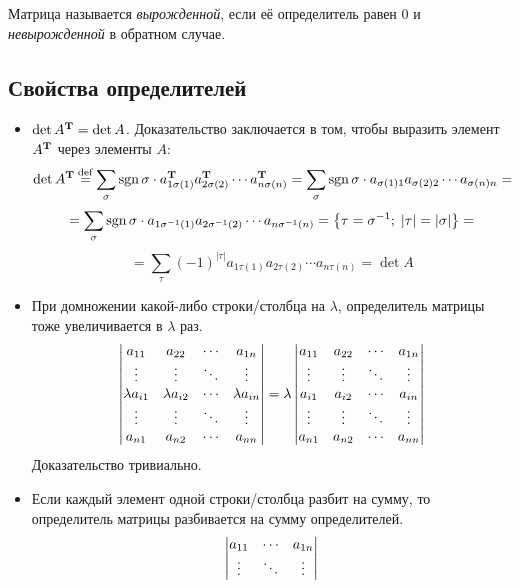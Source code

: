 \begin{df}
  Матрица называется \emph{вырожденной}, если её определитель равен 0 и \emph{невырожденной} в обратном случае.
\end{df}

\subsection{Свойства определителей}

\label{matrixdet:props}

\begin{itemize}
	\item $\det A^{\mathbf{T}}=\det A$. Доказательство
		заключается в том, чтобы выразить элемент $A^{\mathbf{T}}$
		через элементы $A$:
		$$
			\det A^{\mathbf{T}}\mathbin{\stackrel{\mathrm{def}}{=}}
			\sum_\sigma\operatorname{sgn}\sigma\cdot
			a^{\mathbf{T}}_{1\sigma(1)}
			a^{\mathbf{T}}_{2\sigma(2)}
			\cdots
			a^{\mathbf{T}}_{n\sigma(n)} =
			\sum_\sigma\operatorname{sgn}\sigma\cdot
			a_{\sigma(1)1}
			a_{\sigma(2)2}
			\cdots
			a_{\sigma(n)n} =
		$$ $$
			= \sum_\sigma\operatorname{sgn}\sigma\cdot
			a_{1\sigma^{-1}(1)}
			a_{2\sigma^{-1}(2)}
			\cdots
			a_{n\sigma^{-1}(n)} =
			\left\{\tau=\sigma^{-1};\;|\tau|=|\sigma|\right\} =
		$$ $$
			= \sum_\tau(-1)^{|\tau|}
			a_{1\tau(1)}
			a_{2\tau(2)}
			\cdots
			a_{n\tau(n)} = \det A
		$$
	\item При домножении какой-либо строки/столбца на $\lambda$,
		определитель матрицы тоже увеличивается в $\lambda$ раз.
		$$
		\begin{vmatrix}
		a_{11} & a_{22} & \cdots & a_{1n} \\
		\vdots & \vdots & \ddots & \vdots \\
		\lambda a_{i1} & \lambda a_{i2} & \cdots & \lambda a_{in} \\
		\vdots & \vdots & \ddots & \vdots \\
		a_{n1} & a_{n2} & \cdots & a_{nn} \end{vmatrix} =
		\lambda
		\begin{vmatrix}
		a_{11} & a_{22} & \cdots & a_{1n} \\
		\vdots & \vdots & \ddots & \vdots \\
		a_{i1} & a_{i2} & \cdots & a_{in} \\
		\vdots & \vdots & \ddots & \vdots \\
		a_{n1} & a_{n2} & \cdots & a_{nn} \end{vmatrix}
		$$
		Доказательство тривиально.
	\item Если каждый элемент одной строки/столбца разбит на сумму, то
		определитель матрицы разбивается на сумму определителей.
		$$
		\begin{vmatrix}
		a_{11} & \cdots & a_{1n} \\
		\vdots & \ddots & \vdots \\
\end{vmatrix}$$
\end{itemize}
